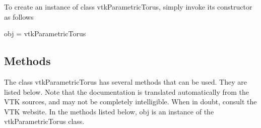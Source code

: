 To create an instance of class vtk\-Parametric\-Torus, simply invoke its constructor as follows \begin{DoxyVerb}  obj = vtkParametricTorus
\end{DoxyVerb}
 \hypertarget{vtkwidgets_vtkxyplotwidget_Methods}{}\subsection{Methods}\label{vtkwidgets_vtkxyplotwidget_Methods}
The class vtk\-Parametric\-Torus has several methods that can be used. They are listed below. Note that the documentation is translated automatically from the V\-T\-K sources, and may not be completely intelligible. When in doubt, consult the V\-T\-K website. In the methods listed below, {\ttfamily obj} is an instance of the vtk\-Parametric\-Torus class. 
